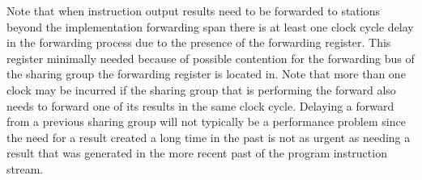 Note that when instruction output results need to be forwarded to
stations beyond the implementation forwarding span there is at least
one clock cycle delay in the forwarding process due to the presence of
the forwarding register.  This register minimally needed because of
possible contention for the forwarding bus of the sharing group the
forwarding register is located in.  Note that more than one clock may
be incurred if the sharing group that is performing the forward also
needs to forward one of its results in the same clock cycle.  Delaying
a forward from a previous sharing group will not typically be a
performance problem since the need for a result created a long time in
the past is not as urgent as needing a result that was generated in the
more recent past of the program instruction stream.



